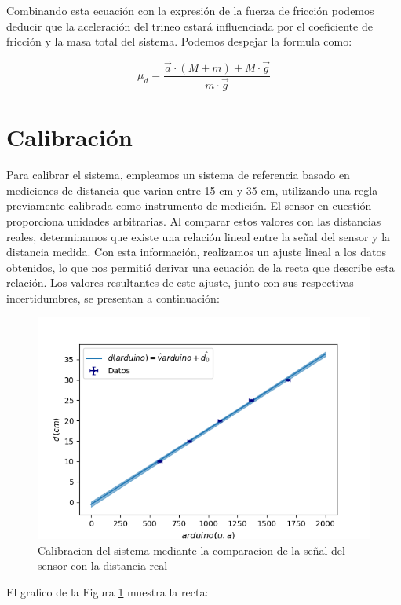 \documentclass[12pt,a4]{article}
\begin{document}
Combinando esta ecuación con la expresión de la fuerza de fricción podemos deducir que la aceleración del trineo estará influenciada por el coeficiente de fricción y la masa total del sistema. Podemos despejar la formula como:

\begin{equation}
    \mu_d = \frac{\vec{a} \cdot (M + m) + M \cdot \vec{g} }{m \cdot \vec{g}}
    \label{eq:mu_d}
\end{equation}

\section{Calibración}

Para calibrar el sistema, empleamos un sistema de referencia basado en mediciones de distancia que varian entre 15 cm y 35 cm, utilizando una regla previamente calibrada como
 instrumento de medición. El sensor en cuestión proporciona unidades arbitrarias. Al comparar estos valores con las distancias reales, determinamos que existe una relación lineal
  entre la señal del sensor y la distancia medida. Con esta información, realizamos un ajuste lineal a los datos obtenidos, lo que nos permitió derivar una ecuación de la recta que
   describe esta relación. Los valores resultantes de este ajuste, junto con sus respectivas incertidumbres, se presentan a continuación:

\begin{figure}[H]
    \centering
    \includegraphics[width=0.8\linewidth]{Calibracion.png}
    \caption{Calibracion del sistema mediante la comparacion de la señal del sensor con la distancia real}
    \label{fig:calibracion}
\end{figure}

El grafico de la Figura \ref{fig:calibracion} muestra la recta:
\end{document}
